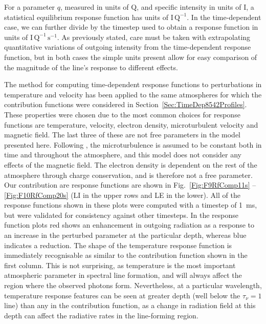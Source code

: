 For a parameter $q$, measured in units of Q, and specific intensity in units of I, a statistical equilibrium response function has units of $\mathrm{I}\,\mathrm{Q}^{-1}$.
In the time-dependent case, we can further divide by the timestep used to obtain a response function in units of $\mathrm{I}\,\mathrm{Q}^{-1}\,\mathrm{s}^{-1}$.
As previously stated, care must be taken with extrapolating quantitative variations of outgoing intensity from the time-dependent response function, but in both cases the simple units present allow for easy comparison of the magnitude of the line's response to different effects.

The method for computing time-dependent response functions to perturbations in temperature and velocity has been applied to the same atmospheres for which the contribution functions were considered in Section~\ref{Sec:TimeDep8542Profiles}.
These properties were chosen due to the most common choices for response functions are temperature, velocity, electron density, microturbulent velocity and magnetic field.
The last three of these are not free parameters in the model presented here.
Following \Radyn{}, the microturbulence is assumed to be constant both in time and throughout the atmosphere, and this model does not consider any effects of the magnetic field.
The electron density is dependent on the rest of the atmosphere through charge conservation, and is therefore not a free parameter.
Our contribution are response functions are shown in Fig.~\ref{Fig:F9RfComp11s} -- \ref{Fig:F10RfComp20s} (LI in the upper rows and LE in the lower).
All of the response functions shown in these plots were computed with a timestep of \SI{1}{\milli\second}, but were validated for consistency against other timesteps.
In the response function plots red shows an enhancement in outgoing radiation as a response to an increase in the perturbed parameter at the particular depth, whereas blue indicates a reduction.
The shape of the temperature response function is immediately recognisable as similar to the contribution function shown in the first column.
This is not surprising, as temperature is the most important atmospheric parameter in spectral line formation, and will always affect the region where the observed photons form.
Nevertheless, at a particular wavelength, temperature response features can be seen at greater depth (well below the $\tau_\nu=1$ line) than any in the contribution function, as a change in radiation field at this depth can affect the radiative rates in the line-forming region.

